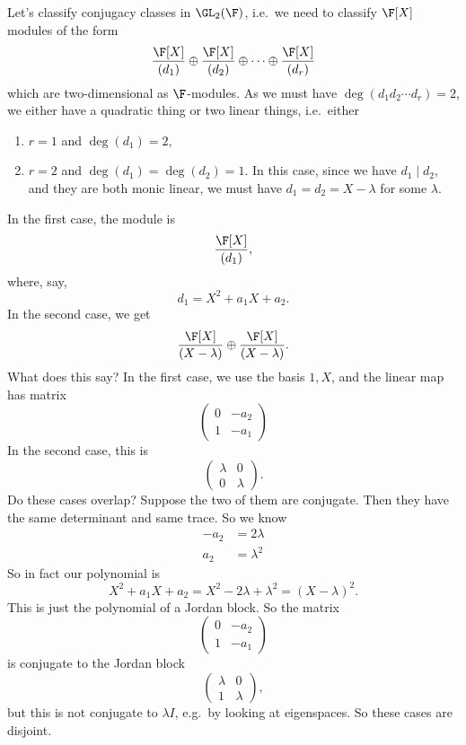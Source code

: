 \documentclass[a4paper]{article}
\begin{document}
\begin{eg}
  Let's classify conjugacy classes in $\GL_2(\F)$, i.e.\ we need to classify $\F[X]$ modules of the form
  \[
    \frac{\F[X]}{(d_1)} \oplus \frac{\F[X]}{(d_2)} \oplus \cdots \oplus \frac{\F[X]}{(d_r)}
  \]
  which are two-dimensional as $\F$-modules. As we must have $\deg(d_1d_2 \cdots d_r) = 2$, we either have a quadratic thing or two linear things, i.e.\ either
  \begin{enumerate}
    \item $r = 1$ and $\deg (d_1) = 2$,
    \item $r = 2$ and $\deg (d_1) = \deg(d_2) = 1$. In this case, since we have $d_1 \mid d_2$, and they are both monic linear, we must have $d_1 = d_2 = X - \lambda$ for some $\lambda$.
  \end{enumerate}
  In the first case, the module is
  \[
    \frac{\F[X]}{(d_1)},
  \]
  where, say,
  \[
    d_1 = X^2 + a_1 X + a_2.
  \]
  In the second case, we get
  \[
    \frac{\F[X]}{(X - \lambda)} \oplus \frac{\F[X]}{(X - \lambda)}.
  \]
  What does this say? In the first case, we use the basis $1, X$, and the linear map has matrix
  \[
    \begin{pmatrix}
      0 & -a_2\\
      1 & -a_1
    \end{pmatrix}
  \]
  In the second case, this is
  \[
    \begin{pmatrix}
      \lambda & 0\\
      0 & \lambda
    \end{pmatrix}.
  \]
  Do these cases overlap? Suppose the two of them are conjugate. Then they have the same determinant and same trace. So we know
  \begin{align*}
    -a_2 &= 2\lambda\\
    a_2 &= \lambda^2
  \end{align*}
  So in fact our polynomial is
  \[
    X^2 + a_1 X + a_2 = X^2 - 2\lambda + \lambda^2 = (X - \lambda)^2.
  \]
  This is just the polynomial of a Jordan block. So the matrix
  \[
    \begin{pmatrix}
      0 & -a_2\\
      1 & -a_1
    \end{pmatrix}
  \]
  is conjugate to the Jordan block
  \[
    \begin{pmatrix}
      \lambda & 0\\
      1 & \lambda
    \end{pmatrix},
  \]
  but this is not conjugate to $\lambda I$, e.g.\ by looking at eigenspaces. So these cases are disjoint.


\end{eg}
\end{document}

